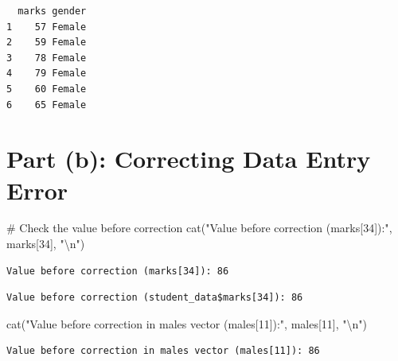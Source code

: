 \documentclass[
  letterpaper,
  DIV=11,
  numbers=noendperiod]{scrartcl}
\newenvironment{Shaded}{\begin{snugshade}}{\end{snugshade}}
\newcommand{\CommentTok}[1]{\textcolor[rgb]{0.37,0.37,0.37}{#1}}
\newcommand{\DecValTok}[1]{\textcolor[rgb]{0.68,0.00,0.00}{#1}}
\newcommand{\FunctionTok}[1]{\textcolor[rgb]{0.28,0.35,0.67}{#1}}
\newcommand{\NormalTok}[1]{\textcolor[rgb]{0.00,0.23,0.31}{#1}}
\newcommand{\SpecialCharTok}[1]{\textcolor[rgb]{0.37,0.37,0.37}{#1}}
\newcommand{\StringTok}[1]{\textcolor[rgb]{0.13,0.47,0.30}{#1}}
\begin{document}
\begin{verbatim}
  marks gender
1    57 Female
2    59 Female
3    78 Female
4    79 Female
5    60 Female
6    65 Female
\end{verbatim}

\section{Part (b): Correcting Data Entry
Error}\label{part-b-correcting-data-entry-error}

\begin{Shaded}
\begin{Highlighting}[]
\CommentTok{\# Check the value before correction}
\FunctionTok{cat}\NormalTok{(}\StringTok{"Value before correction (marks[34]):"}\NormalTok{, marks[}\DecValTok{34}\NormalTok{], }\StringTok{"}\SpecialCharTok{\textbackslash{}n}\StringTok{"}\NormalTok{)}
\end{Highlighting}
\end{Shaded}

\begin{verbatim}
Value before correction (marks[34]): 86 
\end{verbatim}

\begin{Shaded}
\end{Shaded}

\begin{verbatim}
Value before correction (student_data$marks[34]): 86 
\end{verbatim}

\begin{Shaded}
\begin{Highlighting}[]
\FunctionTok{cat}\NormalTok{(}\StringTok{"Value before correction in males vector (males[11]):"}\NormalTok{, males[}\DecValTok{11}\NormalTok{], }\StringTok{"}\SpecialCharTok{\textbackslash{}n}\StringTok{"}\NormalTok{)}
\end{Highlighting}
\end{Shaded}

\begin{verbatim}
Value before correction in males vector (males[11]): 86 
\end{verbatim}
\end{document}
